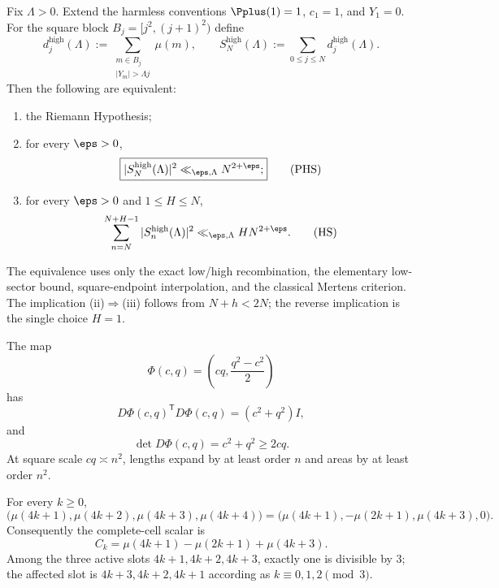 \begin{theorem}
\label{thm:intro-canonical-HS}
Fix $\Lambda>0$.  Extend the harmless conventions $\Pplus(1)=1$, $c_1=1$, and $Y_1=0$.  For the square block $B_j=[j^2,(j+1)^2)$ define
\[
 d_j^{\mathrm{high}}(\Lambda)
 :=
 \sum_{\substack{m\in B_j\\|Y_m|>\Lambda j}}\mu(m),
 \qquad
 S_N^{\mathrm{high}}(\Lambda)
 :=\sum_{0\le j\le N}d_j^{\mathrm{high}}(\Lambda).
\]
Then the following are equivalent:
\begin{enumerate}[label=\textup{(\roman*)},leftmargin=2.2em,itemsep=0.25em]
\item the Riemann Hypothesis;
\item for every $\eps>0$,
\begin{equation}
 \boxed{
 |S_N^{\mathrm{high}}(\Lambda)|^2
 \ll_{\eps,\Lambda}N^{2+\eps};
 }
 \tag{PHS}
 \label{eq:intro-canonical-PHS}
\end{equation}
\item for every $\eps>0$ and $1\le H\le N$,
\begin{equation}
 \sum_{n=N}^{N+H-1}|S_n^{\mathrm{high}}(\Lambda)|^2
 \ll_{\eps,\Lambda}HN^{2+\eps}.
 \tag{HS}
 \label{eq:intro-canonical-HS}
\end{equation}
\end{enumerate}
The equivalence uses only the exact low/high recombination, the elementary low-sector bound, square-endpoint interpolation, and the classical Mertens criterion.  The implication \textup{(ii)}$\Rightarrow$\textup{(iii)} follows from $N+h<2N$; the reverse implication is the single choice $H=1$.
\end{theorem}

\begin{theorem}
\label{thm:intro-jacobian}
The map
\[
 \Phi(c,q)=\left(cq,\frac{q^2-c^2}{2}\right)
\]
has
\[
 D\Phi(c,q)^{\mathsf T}D\Phi(c,q)
 =(c^2+q^2)I,
\]
and
\[
 \det D\Phi(c,q)=c^2+q^2\ge2cq.
\]
At square scale $cq\asymp n^2$, lengths expand by at least order $n$ and areas by at least order $n^2$.
\end{theorem}

\begin{theorem}
\label{thm:intro-dyadic-cell}
For every $k\ge0$,
\[
 \boxed{
 \bigl(\mu(4k+1),\mu(4k+2),\mu(4k+3),\mu(4k+4)\bigr)
 =\bigl(\mu(4k+1),-\mu(2k+1),\mu(4k+3),0\bigr).
 }
\]
Consequently the complete-cell scalar is
\[
 \boxed{C_k=\mu(4k+1)-\mu(2k+1)+\mu(4k+3).}
\]
Among the three active slots $4k+1,4k+2,4k+3$, exactly one is divisible by $3$; the affected slot is $4k+3,4k+2,4k+1$ according as $k\equiv0,1,2\pmod3$.
\end{theorem}

